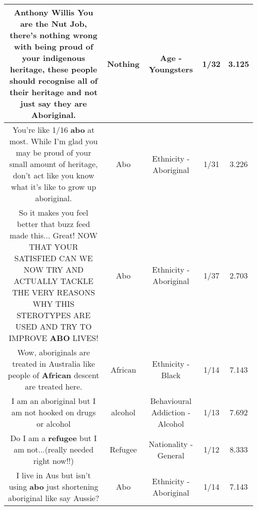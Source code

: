 \documentclass[11pt]{article}
\newlength\mylength
\begin{document}
\begin{center}
\begin{longtable}{|C{.65\mylength}|C{.30\mylength}|C{.12\mylength}|C{.12\mylength}|C{.12\mylength}|}
  \small Anthony Willis You are the Nut Job, there's \textbf{nothing} wrong with being proud of your indigenous heritage, these people should recognise all of their heritage and not just say they are Aboriginal.\normalsize   & Nothing & Age - Youngsters & 1/32 & 3.125 \\  \hline
  \small You're like 1/16 \textbf{abo} at most. While I'm glad you may be proud of your small amount of heritage, don't act like you know what it's like to grow up aboriginal.\normalsize   & Abo & Ethnicity - Aboriginal & 1/31 & 3.226 \\  \hline
  \small So it makes you feel better that buzz feed made this... Great! NOW THAT YOUR SATISFIED CAN WE NOW TRY AND ACTUALLY TACKLE THE VERY REASONS WHY THIS STEROTYPES ARE USED AND TRY TO IMPROVE \textbf{ABO} LIVES!\normalsize   & Abo & Ethnicity - Aboriginal & 1/37 & 2.703 \\  \hline
  \small Wow, aboriginals are treated in Australia like people of \textbf{African} descent are treated here.\normalsize   & African & Ethnicity - Black & 1/14 & 7.143 \\  \hline
  \small I am an aboriginal but I am not hooked on drugs or alcohol\normalsize   & alcohol & Behavioural Addiction - Alcohol & 1/13 & 7.692 \\  \hline
  \small Do I am a \textbf{refugee} but I am not...(really needed right now!!)\normalsize   & Refugee & Nationality - General & 1/12 & 8.333 \\  \hline
  \small I live in Aus but isn't using \textbf{abo} just shortening aboriginal like say Aussie?\normalsize   & Abo & Ethnicity - Aboriginal & 1/14 & 7.143 \\  \hline

\end{longtable}
\end{center}
\end{document}
